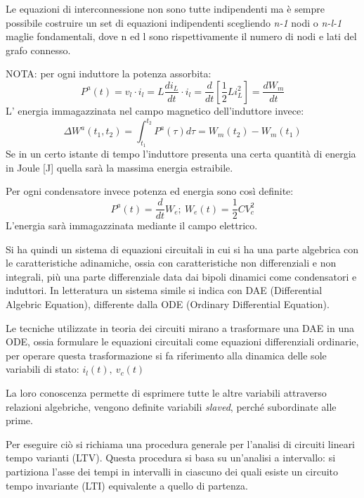 Le equazioni di interconnessione non sono tutte indipendenti ma è sempre possibile
costruire un set di equazioni indipendenti scegliendo \textit{n-1} nodi o \textit{n-l-1} maglie fondamentali,
dove n ed l sono rispettivamente il numero di nodi e lati del grafo connesso.

NOTA: per ogni induttore la potenza assorbita:
$$ P^a(t) = v_l\cdot i_l = L \frac{di_L}{dt}\cdot i_l = \frac{d}{dt} [\frac{1}{2}Li_L^2] = \frac{dW_m}{dt} $$ 
L' energia immagazzinata nel campo magnetico dell'induttore invece:
$$\Delta W^a(t_1,t_2) = \int_{t_1}^{t_2} P^a(\tau)d\tau = W_m (t_2) - W_m(t_1) $$
Se in un certo istante di tempo l'induttore presenta una certa quantità di energia in Joule [\si{\joule}] quella sarà la massima energia estraibile.

Per ogni condensatore invece potenza ed energia sono così definite:
$$P^a(t) = \frac{d}{dt} W_e;\ W_e(t) = \frac{1}{2} CV_c^2$$
L'energia sarà immagazzinata mediante il campo elettrico.

Si ha quindi un sistema di equazioni circuitali in cui si ha una parte algebrica con le caratteristiche adinamiche, ossia con caratteristiche
non differenziali e non integrali, più una parte differenziale data dai bipoli dinamici come condensatori e induttori.
In letteratura un sistema simile si indica con DAE (Differential Algebric Equation), differente
dalla ODE (Ordinary Differential Equation).

Le tecniche utilizzate in teoria dei circuiti mirano a trasformare una DAE in una ODE, ossia 
formulare le equazioni circuitali come equazioni differenziali ordinarie, per operare questa trasformazione si fa 
riferimento alla dinamica delle sole {variabili di stato}: $i_l(t),\ v_c(t)$

La loro conoscenza permette di esprimere tutte le altre variabili attraverso relazioni algebriche, vengono definite
variabili \textit{slaved}, perché subordinate alle prime.

Per eseguire ciò si richiama una procedura generale per l'analisi di circuiti lineari tempo varianti (LTV).
Questa procedura si basa su un'analisi a intervallo: si partiziona l'asse dei tempi in intervalli in ciascuno dei 
quali esiste un circuito tempo invariante (LTI) equivalente a quello di partenza.

